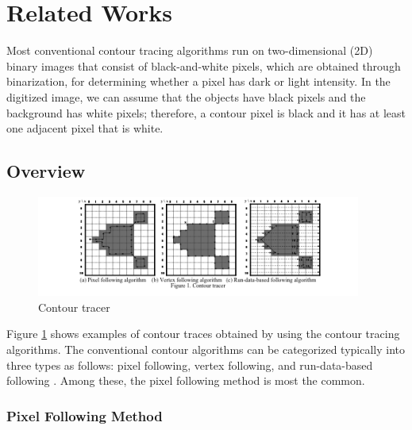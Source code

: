 
\section{Related Works}

Most conventional contour tracing algorithms run on two-dimensional (2D) binary images that consist of black-and-white pixels, which are obtained through binarization, for determining whether a pixel has dark or light intensity. In the digitized image, we can assume that the objects have black pixels and the background has white pixels; therefore, a contour pixel is black and it has at least one adjacent pixel that is white.

\subsection{Overview}

\begin{figure}[htbp]
	\centering
	\includegraphics[width=0.95\textwidth]{2.RelatedWorks/contour_tracer.png}
	\caption{Contour tracer}
	\label{fig:contour_tracer}
\end{figure}

Figure \ref{fig:contour_tracer} shows examples of contour traces obtained by using the contour tracing algorithms. The conventional contour algorithms can be categorized typically into three types as follows: pixel following, vertex following, and run-data-based following \cite{Miyatake1997Contour,Danielsson1981Improvement,Shoji1999Contour}. Among these, the pixel following method is most the common.

\subsubsection{Pixel Following Method}

